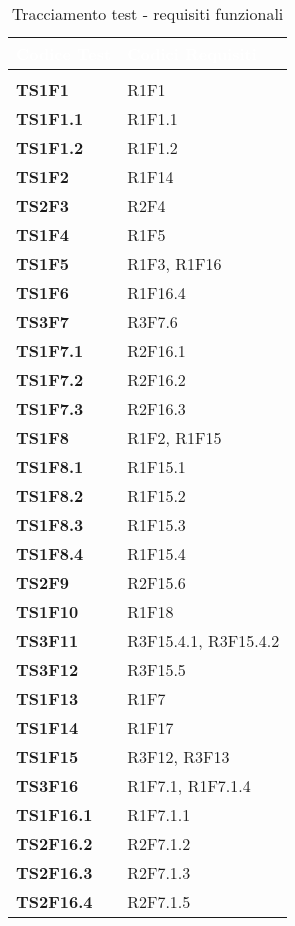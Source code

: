 {\renewcommand{\arraystretch}{1.5}
\renewcommand\extrarowheight{1.5pt}
\begin{longtable}{C{2.5cm} | C{10cm} } 
		\textcolor{white}{\textbf{Codice Test}} & 
		\textcolor{white}{\textbf{Codici Requisiti}} \\
		\endfirsthead
		 \\
	    \endfoot
	    \caption{Tracciamento test - requisiti funzionali}
	    \endlastfoot
		\textbf{TS1F1} & R1F1\\
		\textbf{TS1F1.1} & R1F1.1\\
		\textbf{TS1F1.2} & R1F1.2\\
		\textbf{TS1F2} & R1F14\\
		\textbf{TS2F3} & R2F4\\
		\textbf{TS1F4} & R1F5\\
		\textbf{TS1F5} & R1F3, R1F16\\
		\textbf{TS1F6} & R1F16.4\\
		\textbf{TS3F7} & R3F7.6\\
		\textbf{TS1F7.1} & R2F16.1\\
		\textbf{TS1F7.2} & R2F16.2\\
		\textbf{TS1F7.3} & R2F16.3\\
		\textbf{TS1F8} & R1F2, R1F15\\
		\textbf{TS1F8.1} & R1F15.1\\
		\textbf{TS1F8.2} & R1F15.2\\
		\textbf{TS1F8.3} & R1F15.3\\
		\textbf{TS1F8.4} & R1F15.4\\
		\textbf{TS2F9} & R2F15.6\\
		\textbf{TS1F10} & R1F18\\
		\textbf{TS3F11} & R3F15.4.1, R3F15.4.2\\
		\textbf{TS3F12} & R3F15.5\\
		\textbf{TS1F13} & R1F7\\
		\textbf{TS1F14} & R1F17\\
		\textbf{TS1F15} & R3F12, R3F13\\
		\textbf{TS3F16} & R1F7.1, R1F7.1.4\\
		\textbf{TS1F16.1} & R1F7.1.1\\
		\textbf{TS2F16.2} & R2F7.1.2\\
		\textbf{TS2F16.3} & R2F7.1.3\\				
		\textbf{TS2F16.4} & R2F7.1.5\\	

\end{longtable}}
